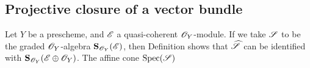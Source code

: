 \subsection{Projective closure of a vector bundle}
\label{subsection:2.8.4}

\begin{env}[8.4.1]
\label{2.8.4.1}
Let $Y$ be a prescheme, and $\mathscr{E}$ a quasi-coherent $\mathscr{O}_Y$-module.
If we take $\mathscr{S}$ to be the graded $\mathscr{O}_Y$-algebra $\mathbf{S}_{\mathscr{O}_Y}(\mathscr{E})$, then Definition  shows that $\widehat{\mathscr{S}}$ can be identified with $\mathbf{S}_{\mathscr{O}_Y}(\mathscr{E}\oplus\mathscr{O}_Y)$.
The affine cone $\operatorname{Spec}(\mathscr{S})$
\end{env}
















